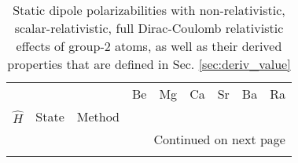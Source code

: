 \begin{longtable}{lllllllll}
\caption{Static dipole polarizabilities with non-relativistic, scalar-relativistic, full Dirac-Coulomb relativistic effects of group-2 atoms, as well as their derived properties that are defined in Sec. \ref{sec:deriv_value}}\label{tab:dipole_group_2}\\
\toprule
      &         &                                    &              Be &            Mg &           Ca &             Sr &            Ba &           Ra \\
$\hat{H}$ & State & Method &                 &               &              &                &               &              \\
\midrule
\endhead
\midrule
\multicolumn{9}{r}{{Continued on next page}} \\
\midrule
\endfoot


\end{longtable}
